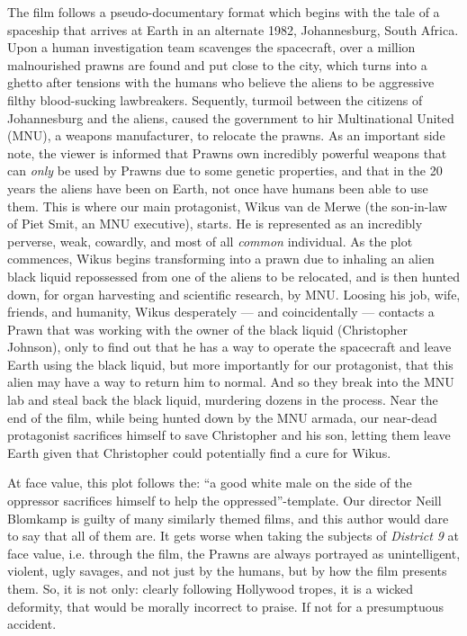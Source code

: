 \documentclass[10pt, letterpaper]{article}
\theoremstyle{definition}
\begin{document}
	The film follows a pseudo-documentary format which begins with the tale of a spaceship that arrives at Earth in an alternate 1982, Johannesburg, South Africa. Upon a human investigation team scavenges the spacecraft, over a million malnourished prawns are found and put close to the city, which turns into a ghetto after tensions with the humans who believe the aliens to be aggressive filthy blood-sucking lawbreakers. Sequently, turmoil between the citizens of Johannesburg and the aliens, caused the government to hir Multinational United (MNU), a weapons manufacturer, to relocate the prawns. As an important side note, the viewer is informed that Prawns own incredibly powerful weapons that can \emph{only} be used by Prawns due to some genetic properties, and that in the 20 years the aliens have been on Earth, not once have humans been able to use them. This is where our main protagonist, Wikus van de Merwe (the son-in-law of Piet Smit, an MNU executive), starts. He is represented as an incredibly perverse, weak, cowardly, and most of all \emph{common} individual. As the plot commences, Wikus begins transforming into a prawn due to inhaling an alien black liquid repossessed from one of the aliens to be relocated, and is then hunted down, for organ harvesting and scientific research, by MNU. Loosing his job, wife, friends, and humanity, Wikus desperately --- and coincidentally --- contacts a Prawn that was working with the owner of the black liquid (Christopher Johnson), only to find out that he has a way to operate the spacecraft and leave Earth using the black liquid, but more importantly for our protagonist, that this alien may have a way to return him to normal. And so they break into the MNU lab and steal back the black liquid, murdering dozens in the process. Near the end of the film, while being hunted down by the MNU armada, our near-dead protagonist sacrifices himself to save Christopher and his son, letting them leave Earth given that Christopher could potentially find a cure for Wikus.
	
	At face value, this plot follows the: ``a good white male on the side of the oppressor sacrifices himself to help the oppressed''-template. Our director Neill Blomkamp is guilty of many similarly themed films, and this author would dare to say that all of them are. It gets worse when taking the subjects of \emph{District 9} at face value, i.e. through the film, the Prawns are always portrayed as unintelligent, violent, ugly savages, and not just by the humans, but by how the film presents them. So, it is not only: clearly following Hollywood tropes, it is a wicked deformity, that would be morally incorrect to praise. If not for a presumptuous accident.
	
\end{document}
